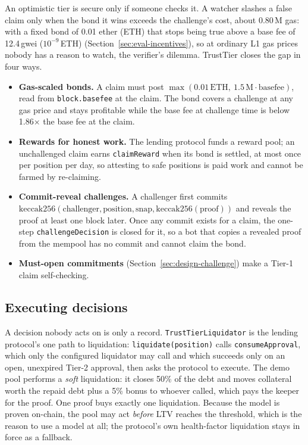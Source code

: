 \documentclass[sigconf,nonacm]{acmart}
\newcommand{\code}[1]{\texttt{\smaller #1}}
\begin{document}
An optimistic tier is secure only if someone checks it. A watcher slashes a false claim only when the bond it wins exceeds the challenge's cost, about 0.80\,M gas: with a fixed bond of 0.01 ether (ETH) that stops being true above a base fee of 12.4\,gwei ($10^{-9}$\,ETH) (Section~\ref{sec:eval-incentives}), so at ordinary L1 gas prices nobody has a reason to watch, the verifier's dilemma. TrustTier closes the gap in four ways.
\begin{itemize}
  \item \textbf{Gas-scaled bonds.} A claim must post $\max(0.01\,\mathrm{ETH},\ 1.5\,\mathrm{M}\cdot\mathrm{basefee})$, read from \code{block.basefee} at the claim. The bond covers a challenge at any gas price and stays profitable while the base fee at challenge time is below 1.86$\times$ the base fee at the claim.
  \item \textbf{Rewards for honest work.} The lending protocol funds a reward pool; an unchallenged claim earns \code{claimReward} when its bond is settled, at most once per position per day, so attesting to safe positions is paid work and cannot be farmed by re-claiming.
  \item \textbf{Commit-reveal challenges.} A challenger first commits $\mathrm{keccak256}(\mathrm{challenger}, \mathrm{position}, \mathrm{snap}, \mathrm{keccak256}(\mathrm{proof}))$ and reveals the proof at least one block later. Once any commit exists for a claim, the one-step \code{challengeDecision} is closed for it, so a bot that copies a revealed proof from the mempool has no commit and cannot claim the bond.
  \item \textbf{Must-open commitments} (Section~\ref{sec:design-challenge}) make a Tier-1 claim self-checking.
\end{itemize}

\subsection{Executing decisions}
\label{sec:design-consumer}

A decision nobody acts on is only a record. \code{TrustTierLiquidator} is the lending protocol's one path to liquidation: \code{liquidate(position)} calls \code{consumeApproval}, which only the configured liquidator may call and which succeeds only on an open, unexpired Tier-2 approval, then asks the protocol to execute. The demo pool performs a \emph{soft} liquidation: it closes 50\% of the debt and moves collateral worth the repaid debt plus a 5\% bonus to whoever called, which pays the keeper for the proof. One proof buys exactly one liquidation. Because the model is proven on-chain, the pool may act \emph{before} LTV reaches the threshold, which is the reason to use a model at all; the protocol's own health-factor liquidation stays in force as a fallback.
\end{document}
